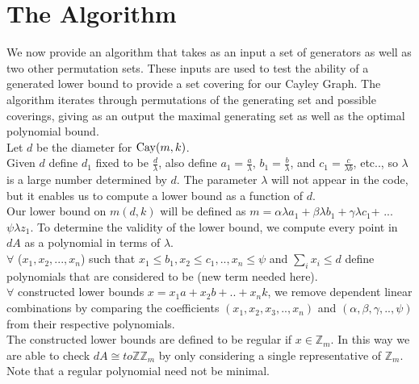 

\section{The Algorithm}

We now provide an algorithm that takes as an input a set of generators as well as two other permutation sets. These inputs are used to test the ability of a generated lower bound to provide a set covering for our Cayley Graph. The algorithm iterates through permutations of the generating set and possible coverings, giving as an output the maximal generating set as well as the optimal polynomial bound.\\

Let $d$ be the diameter for $\operatorname{Cay}(m, k)$.\\

Given $d$ define $d_{1}$ fixed to be $\frac{d}{\lambda}$, also define $a_{1} = \frac{a}{\lambda}$, $b_{1} = \frac{b}{\lambda}$, and $c_{1} = \frac{c}{\lambda b}$, etc.., so $\lambda$ is a large number determined by $d$. The parameter $\lambda$ will not appear in the code, but it enables us to compute a lower bound as a function of $d$.\\

Our lower bound on $m(d, k)$ will be defined as $m =\alpha \lambda a_{1} + \beta \lambda b_{1} + \gamma \lambda c_{1}$+ ... $\psi \lambda z_{1}$.  To determine the validity of the lower bound, we compute every point in $dA$ as a polynomial in terms of $\lambda$.\\

$\forall$ ($x_{1}, x_{2}, ... , x_{n}$) such that $x_{1} \leq b_{1}, x_{2} \leq c_{1}, .. , x_{n} \leq \psi$ and $\sum_{i} x_{i} \leq d$ define polynomials that are considered to be (new term needed here).\\

$\forall$ constructed lower bounds $x = x_{1}a + x_{2}b + .. + x_{n}k$, we remove dependent linear combinations by comparing the coefficients $(x_{1}, x_{2}, x_{3}, .. , x_{n})$ and $(\alpha, \beta, \gamma, .. , \psi)$ from their respective polynomials.\\

The constructed lower bounds are defined to be regular if $x \in \mathbb{Z}_{m}$. In this way we are able to check $dA \cong to \mathbb{ZZ}_{m}$ by only considering a single representative of $\mathbb{Z}_{m}$.
\\ Note that a regular polynomial need not be minimal.\\


